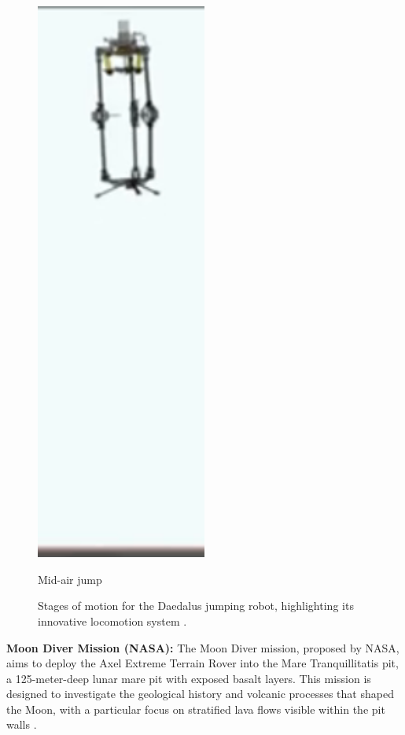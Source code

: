 \begin{figure}[H]
\begin{minipage}[b]{0.2\textwidth}
        \includegraphics[width=0.5\textwidth]{daedalus-jumper-3.png}
        \caption*{Mid-air jump}
    \end{minipage}
    \caption{Stages of motion for the Daedalus jumping robot, highlighting its innovative locomotion system \cite{esa-daedalus}.}
    \label{fig:lunar_robot_movement}
\end{figure}

\textbf{Moon Diver Mission (NASA):}  
The Moon Diver mission, proposed by NASA, aims to deploy the Axel Extreme Terrain Rover into the Mare Tranquillitatis pit, a 125-meter-deep lunar mare pit with exposed basalt layers. This mission is designed to investigate the geological history and volcanic processes that shaped the Moon, with a particular focus on stratified lava flows visible within the pit walls \cite{kerber2023, nesnas2019}.


